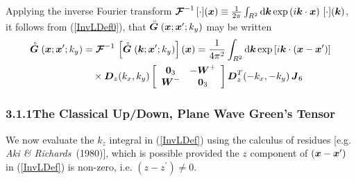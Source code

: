 \documentclass[11pt,a4paper]{article}
\newcommand{\CB}[1]{\mbox{\boldmath$\cal #1$\unboldmath}}
\newcommand{\bmi}[1]{\mbox{\boldmath$\mit #1$\unboldmath}}
\newcommand{\rf}[1]{\stackrel{\scriptscriptstyle _{\,\,\circ}}{ #1}}
\begin{document}
Applying the inverse Fourier transform
${\CB F}^{-1}\, [\cdot]({\bmi x}) \equiv \frac{1}{{2 \pi}}
\int_{R^2 } {\rm d}{\bmi k} \exp \left(i {\bmi k}\cdot {\bmi x}\right)\,
[\cdot] ({\bmi k})$,
it follows from (\ref{InvLDef0}),
that $\rf{\bmi  G}({\bmi x};{\bmi x}^{\prime};k_y)$
may be written
\begin{align} \label{InvLDef}
\rf{\bmi  G}({\bmi x};{\bmi x}^{\prime};k_y)&={\CB F}^{-1}\, \left[\rf{\bmi  G}({\bmi
k};{\bmi x}^{\prime};k_y) \right]({\bmi x}) =\frac{1}{4 \pi^2}
\int_{R^2 } {\rm d}{\bmi k} \exp \left[i {\bmi k}\cdot ({\bmi x}-{\bmi
x}^{\prime})\right]\nonumber\\
&\quad\times {\bmi  D}_{z}({k}_{x},{k}_{y})
\left[{\begin{array}{cc}{\bf 0}_{3}&-{\bmi W}^{+}\\
{\bmi W}^{-}&{\bf 0}_{3}\end{array}}\right]{\bmi  D}_{z}^{T}(-{k}_{x},-{k}_{y})
\,{\bmi  J}_6
\end{align}

\subsubsection*{3.1.1\quad The Classical Up/Down, Plane Wave Green's Tensor}
We now evaluate the $k_{z}$ integral in (\ref{InvLDef}) using the calculus of
residues [e.g. {\em Aki \& Richards\/}~(1980)], which is possible provided
the $z$ component of  $({\bmi x}-{\bmi x}^{\prime})$ in  (\ref{InvLDef})
is non-zero, i.e. $({z}-{z}^{\prime})\not=0 $.
\end{document}

